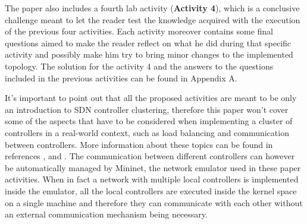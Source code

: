 \documentclass[12pt, a4paper]{article}
\begin{document}
The paper also includes a fourth lab activity (\textbf{Activity 4}), which is a conclusive challenge meant
to let the reader test the knowledge acquired with the execution of the previous
four activities. Each activity moreover contains some final questions aimed to make the reader
reflect on what he did during that specific activity and possibly make him try to
bring minor changes to the implemented topology. The solution for the activity 4
and the answers to the questions included in the previous activities can be
found in Appendix A.

It's important to point out that all the proposed activities are meant to be
only an introduction to SDN controller clustering, therefore this paper won't cover
some of the aspects that have to be considered when implementing a cluster of
controllers in a real-world context, such as load balancing and communication
between controllers. More information about these topics can be found in references
\cite{ref-2}, \cite{ref-1} and \cite{ref-9}.
The communication between different controllers can however be automatically managed
by Mininet, the network emulator used in these paper activities. When in fact a
network with multiple local controllers is implemented inside the emulator, all
the local controllers are executed inside the kernel space on a single machine
and therefore they can communicate with each other without an external
communication mechanism being necessary.






\end{document}
